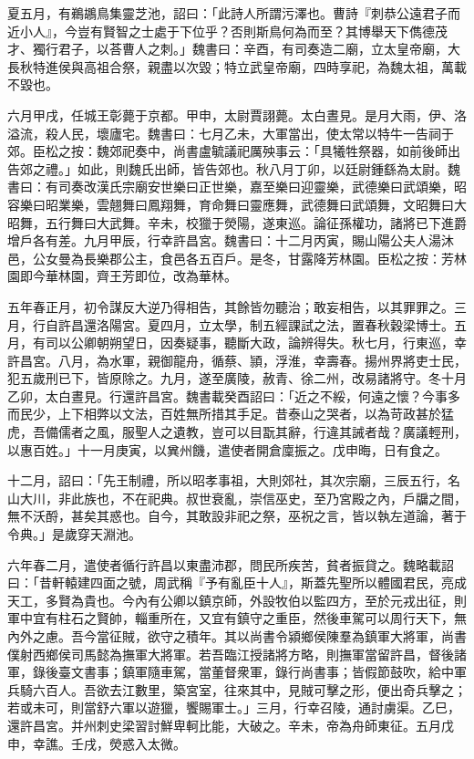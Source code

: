 \begin{pinyinscope}
夏五月，有鵜鶘鳥集靈芝池，詔曰：「此詩人所謂污澤也。曹詩『刺恭公遠君子而近小人』，今豈有賢智之士處于下位乎？否則斯鳥何為而至？其博舉天下儁德茂才、獨行君子，以荅曹人之刺。」魏書曰：辛酉，有司奏造二廟，立太皇帝廟，大長秋特進侯與高祖合祭，親盡以次毀；特立武皇帝廟，四時享祀，為魏太祖，萬載不毀也。

六月甲戌，任城王彰薨于京都。甲申，太尉賈詡薨。太白晝見。是月大雨，伊、洛溢流，殺人民，壞廬宅。魏書曰：七月乙未，大軍當出，使太常以特牛一告祠于郊。臣松之按：魏郊祀奏中，尚書盧毓議祀厲殃事云：「具犧牲祭器，如前後師出告郊之禮。」如此，則魏氏出師，皆告郊也。秋八月丁卯，以廷尉鍾繇為太尉。魏書曰：有司奏改漢氏宗廟安世樂曰正世樂，嘉至樂曰迎靈樂，武德樂曰武頌樂，昭容樂曰昭業樂，雲翹舞曰鳳翔舞，育命舞曰靈應舞，武德舞曰武頌舞，文昭舞曰大昭舞，五行舞曰大武舞。辛未，校獵于熒陽，遂東巡。論征孫權功，諸將已下進爵增戶各有差。九月甲辰，行幸許昌宮。魏書曰：十二月丙寅，賜山陽公夫人湯沐邑，公女曼為長樂郡公主，食邑各五百戶。是冬，甘露降芳林園。臣松之按：芳林園即今華林園，齊王芳即位，改為華林。

五年春正月，初令謀反大逆乃得相告，其餘皆勿聽治；敢妄相告，以其罪罪之。三月，行自許昌還洛陽宮。夏四月，立太學，制五經課試之法，置春秋穀梁博士。五月，有司以公卿朝朔望日，因奏疑事，聽斷大政，論辨得失。秋七月，行東巡，幸許昌宮。八月，為水軍，親御龍舟，循蔡、頴，浮淮，幸壽春。揚州界將吏士民，犯五歲刑已下，皆原除之。九月，遂至廣陵，赦青、徐二州，改易諸將守。冬十月乙卯，太白晝見。行還許昌宮。魏書載癸酉詔曰：「近之不綏，何遠之懷？今事多而民少，上下相弊以文法，百姓無所措其手足。昔泰山之哭者，以為苛政甚於猛虎，吾備儒者之風，服聖人之遺教，豈可以目翫其辭，行違其誡者哉？廣議輕刑，以惠百姓。」十一月庚寅，以兾州饑，遣使者開倉廩振之。戊申晦，日有食之。

十二月，詔曰：「先王制禮，所以昭孝事祖，大則郊社，其次宗廟，三辰五行，名山大川，非此族也，不在祀典。叔世衰亂，崇信巫史，至乃宮殿之內，戶牖之間，無不沃酹，甚矣其惑也。自今，其敢設非祀之祭，巫祝之言，皆以執左道論，著于令典。」是歲穿天淵池。

六年春二月，遣使者循行許昌以東盡沛郡，問民所疾苦，貧者振貸之。魏略載詔曰：「昔軒轅建四面之號，周武稱『予有亂臣十人』，斯蓋先聖所以體國君民，亮成天工，多賢為貴也。今內有公卿以鎮京師，外設牧伯以監四方，至於元戎出征，則軍中宜有柱石之賢帥，輜重所在，又宜有鎮守之重臣，然後車駕可以周行天下，無內外之慮。吾今當征賊，欲守之積年。其以尚書令潁鄉侯陳羣為鎮軍大將軍，尚書僕射西鄉侯司馬懿為撫軍大將軍。若吾臨江授諸將方略，則撫軍當留許昌，督後諸軍，錄後臺文書事；鎮軍隨車駕，當董督衆軍，錄行尚書事；皆假節鼓吹，給中軍兵騎六百人。吾欲去江數里，築宮室，往來其中，見賊可擊之形，便出奇兵擊之；若或未可，則當舒六軍以遊獵，饗賜軍士。」三月，行幸召陵，通討虜渠。乙巳，還許昌宮。并州刺史梁習討鮮卑軻比能，大破之。辛未，帝為舟師東征。五月戊申，幸譙。壬戌，熒惑入太微。


\end{pinyinscope}
